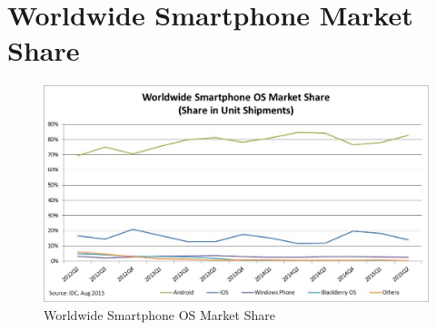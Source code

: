 \chapter{Worldwide Smartphone Market Share}
\label{appendix:worldwidesmartphonemarketshare}

\begin{figure}[ht]
	\centering
	\includegraphics[scale=0.65]{images/phoneMarketShare.png}
	\caption{Worldwide Smartphone OS Market Share \citep{idcsmartphonereport}}
\end{figure}